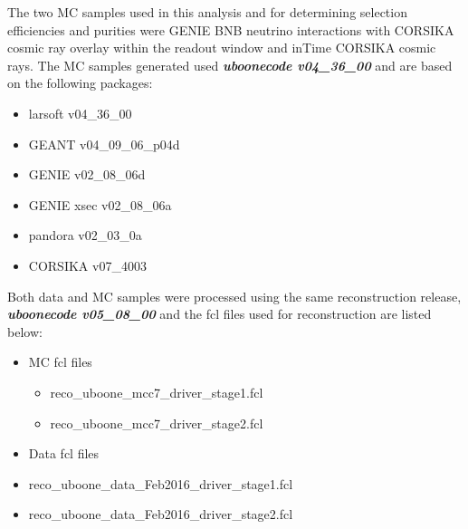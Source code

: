 The two MC samples used in this analysis and for determining selection efficiencies and purities were GENIE BNB neutrino interactions with CORSIKA cosmic ray overlay within the readout window and inTime CORSIKA cosmic rays. The MC samples generated used \textit{\textbf{uboonecode v04\_36\_00}} and are based on the following packages:
\begin{itemize}
\item{larsoft v04\_36\_00}
\item{GEANT v04\_09\_06\_p04d}
\item{GENIE v02\_08\_06d}
\item{GENIE xsec v02\_08\_06a}
\item{pandora v02\_03\_0a}
\item{CORSIKA v07\_4003}
\end{itemize}

Both data and MC samples were processed using the same reconstruction release, \textit{\textbf{uboonecode v05\_08\_00}} and the fcl files used for reconstruction are listed below:
\begin{itemize}
\item{MC fcl files}
\begin{itemize}
\item{reco\_uboone\_mcc7\_driver\_stage1.fcl}
\item{reco\_uboone\_mcc7\_driver\_stage2.fcl}
\end{itemize}
\item{Data fcl files}
\item{reco\_uboone\_data\_Feb2016\_driver\_stage1.fcl}
\item{reco\_uboone\_data\_Feb2016\_driver\_stage2.fcl}
\end{itemize}

